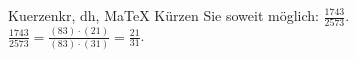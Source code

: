 \begin{MAufgabe}{Kuerzen}{kr, dh, MaTeX}
K\"urzen Sie soweit m\"oglich: $\frac{1743}{2573}$.\\ 
\ifLsg\MLoesung
\quad $\frac{1743}{2573}=\frac{(83)\cdot(21)}{(83)\cdot(31)}=\frac{21}{31}$.\else\relax\fi
 \end{MAufgabe}